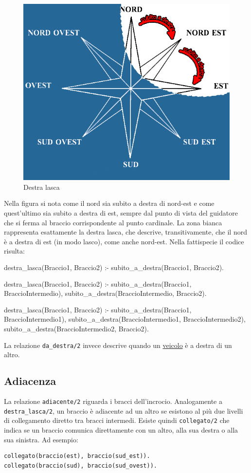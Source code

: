 \begin{figure}[htb]
	\centering
	\includegraphics[width=.8\textwidth]{images/right}
	\caption{Destra lasca}
	\label{fig:right}
\end{figure}

Nella figura si nota come il nord sia subito a destra di nord-est e come quest'ultimo sia subito a destra di est, sempre dal punto di vista del guidatore che si ferma al braccio corrispondente al punto cardinale. La zona bianca rappresenta esattamente la destra lasca, che descrive, transitivamente, che il nord è a destra di est (in modo lasco), come anche nord-est. Nella fattispecie il codice risulta:

\begin{verbatimtab}
destra_lasca(Braccio1, Braccio2) :-
	subito_a_destra(Braccio1, Braccio2).

destra_lasca(Braccio1, Braccio2) :-
	subito_a_destra(Braccio1, BraccioIntermedio),
	subito_a_destra(BraccioIntermedio, Braccio2).

destra_lasca(Braccio1, Braccio2) :-
	subito_a_destra(Braccio1, BraccioIntermedio1),
	subito_a_destra(BraccioIntermedio1, BraccioIntermedio2),
	subito_a_destra(BraccioIntermedio2, Braccio2).
\end{verbatimtab}

La relazione \texttt{da\_destra/2} invece descrive quando un \underline{veicolo} è a destra di un altro.


\subsection{Adiacenza}
La relazione \texttt{adiacente/2} riguarda i bracci dell'incrocio. Analogamente a \texttt{destra\_lasca/2}, un braccio è adiacente ad un altro se esistono al più due livelli di collegamento diretto tra bracci intermedi. Esiste quindi \texttt{collegato/2} che indica se un braccio comunica direttamente con un altro, alla sua destra o alla sua sinistra. Ad esempio:
\begin{verbatim}
collegato(braccio(est), braccio(sud_est)).
collegato(braccio(sud), braccio(sud_ovest)).
\end{verbatim}

